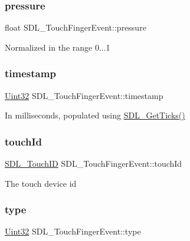 \subsubsection{\texorpdfstring{pressure}{pressure}}
{\footnotesize\ttfamily float S\+D\+L\+\_\+\+Touch\+Finger\+Event\+::pressure}

Normalized in the range 0...1 \mbox{\label{struct_s_d_l___touch_finger_event_abde2ab5cb013bbd21e37a65e2f8fa666}} 
\subsubsection{\texorpdfstring{timestamp}{timestamp}}
{\footnotesize\ttfamily \hyperlink{_s_d_l__stdinc_8h_add440eff171ea5f55cb00c4a9ab8672d}{Uint32} S\+D\+L\+\_\+\+Touch\+Finger\+Event\+::timestamp}

In milliseconds, populated using \hyperlink{_s_d_l__timer_8h_a0b9bc71d6287e0ffafdc3419760fe2b3}{S\+D\+L\+\_\+\+Get\+Ticks()} \mbox{\label{struct_s_d_l___touch_finger_event_ad7a6f39ec9af1bf47b160d18314edd70}} 
\subsubsection{\texorpdfstring{touch\+Id}{touchId}}
{\footnotesize\ttfamily \hyperlink{_s_d_l__touch_8h_a10f5f86abe4ea8308a8706bd5d3b337a}{S\+D\+L\+\_\+\+Touch\+ID} S\+D\+L\+\_\+\+Touch\+Finger\+Event\+::touch\+Id}

The touch device id \mbox{\label{struct_s_d_l___touch_finger_event_a3883218fa3426065ca66086c100edbfa}} 
\subsubsection{\texorpdfstring{type}{type}}
{\footnotesize\ttfamily \hyperlink{_s_d_l__stdinc_8h_add440eff171ea5f55cb00c4a9ab8672d}{Uint32} S\+D\+L\+\_\+\+Touch\+Finger\+Event\+::type}

